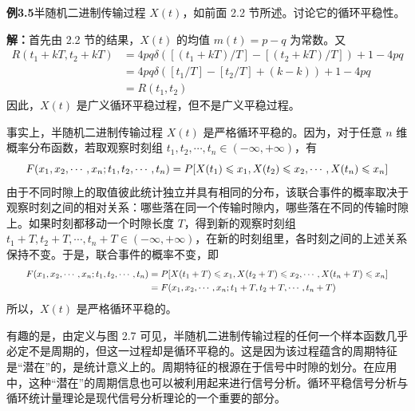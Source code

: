 \documentclass[11pt,openany,UTF8]{ctexbook}
\begin{document}
\begin{examplebox}
\textbf{例3.5}\quad 半随机二进制传输过程 $X(t)$\nobreak，如前面 2.2 节所述\nobreak。讨论它的循环平稳性\nobreak。

\textbf{解\nobreak：}\quad 首先由 2.2 节的结果\nobreak，$X(t)$ 的均值 $m(t)=p-q$ 为常数\nobreak。又
\[
\begin{aligned}
R(t_1+kT,t_2+kT)&=4pq\delta\left(\left[(t_1+kT)/T\right]-\left[(t_2+kT)/T\right]\right)+1-4pq\\
&=4pq\delta\left(\left[t_1/T\right]-\left[t_2/T\right]+(k-k)\right)+1-4pq\\
&=R(t_1,t_2)
\end{aligned}
\]
因此\nobreak，$X(t)$ 是广义循环平稳过程\nobreak，但不是广义平稳过程\nobreak。

事实上\nobreak，半随机二进制传输过程 $X(t)$ 是严格循环平稳的\nobreak。因为\nobreak，对于任意 $n$ 维概率分布函数\nobreak，若取观察时刻组 $t_1,t_2,\cdots,t_n\in(-\infty,+\infty)$\nobreak，有
\[
\resizebox{\dimexpr\linewidth-2em\relax}{!}{$\displaystyle
F(x_1,x_2,\cdots,x_n;t_1,t_2,\cdots,t_n)=P[X(t_1)\leqslant x_1,X(t_2)\leqslant x_2,\cdots,X(t_n)\leqslant x_n]$}
\]
由于不同时隙上的取值彼此统计独立并具有相同的分布\nobreak，该联合事件的概率取决于观察时刻之间的相对关系\nobreak：哪些落在同一个传输时隙内\nobreak，哪些落在不同的传输时隙上\nobreak。如果时刻都移动一个时隙长度 $T$\nobreak，得到新的观察时刻组 $t_1+T,t_2+T,\cdots,t_n+T\in(-\infty,+\infty)$\nobreak，在新的时刻组里\nobreak，各时刻之间的上述关系保持不变\nobreak。于是\nobreak，联合事件的概率不变\nobreak，即
\[
\resizebox{\dimexpr\linewidth-2em\relax}{!}{$\displaystyle
\begin{aligned}
F(x_1,x_2,\cdots,x_n;t_1,t_2,\cdots,t_n)&=P[X(t_1+T)\leqslant x_1,X(t_2+T)\leqslant x_2,\cdots,X(t_n+T)\leqslant x_n]\\
&=F(x_1,x_2,\cdots,x_n;t_1+T,t_2+T,\cdots,t_n+T)
\end{aligned}$}
\]
所以\nobreak，$X(t)$ 是严格循环平稳的\nobreak。
\end{examplebox}

有趣的是\nobreak，由定义与图 2.7 可见\nobreak，半随机二进制传输过程的任何一个样本函数几乎必定不是周期的\nobreak，但这一过程却是循环平稳的\nobreak。这是因为该过程蕴含的周期特征是“潜在”的\nobreak，是统计意义上的\nobreak。周期特征的根源在于信号中时隙的划分\nobreak。在应用中\nobreak，这种“潜在”的周期信息也可以被利用起来进行信号分析\nobreak。循环平稳信号分析与循环统计量理论是现代信号分析理论的一个重要的部分\nobreak。
\end{document}
